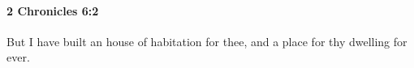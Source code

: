 
		\paragraph{2 Chronicles 6:2} %
			\label{2CHRONICLES-6-2}

			But I have built an house of habitation for thee, and a place for thy dwelling for ever.


